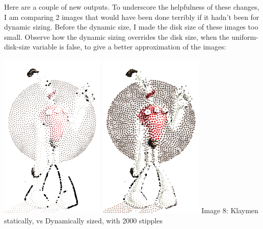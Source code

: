 \documentclass[11pt]{article}
\begin{document}
Here are a couple of new outputs. To underscore the helpfulness of these changes, I am comparing 2 images that would have been done terribly if it hadn't been for dynamic sizing. Before the dynamic size, I made the disk size of these images too small. Observe how the dynamic sizing overrides the disk size, when the uniform-disk-size variable is false, to give a better approximation of the images: 

\includegraphics[width=5cm, height=8cm]{klaymen-old-2000.png} 
\includegraphics[width=5cm, height=8cm]{klaymen-new-2000.png}
\newline Image 8: Klaymen statically, vs Dynamically sized, with 2000 stipples 
\end{document}
